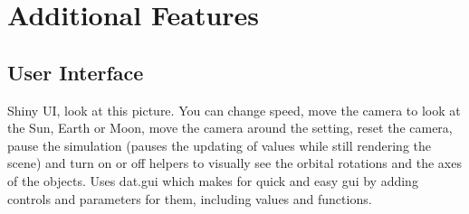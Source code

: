 \documentclass[12pt]{article}
\begin{document}

\section{Additional Features}
\subsection{User Interface}
Shiny UI, look at this picture. You can change speed, move the camera to look at the Sun, Earth or Moon, move the camera around the setting, reset the camera, pause the simulation (pauses the updating of values while still rendering the scene) and turn on or off helpers to visually see the orbital rotations and the axes of the objects. Uses dat.gui \cite{datgui} which makes for quick and easy gui by adding controls and parameters for them, including values and functions.
\end{document}
